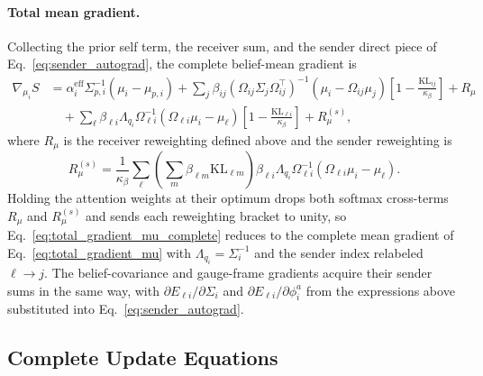 \documentclass[11pt]{article}
\begin{document}
\paragraph{Total mean gradient.}
Collecting the prior self term, the receiver sum, and the sender direct piece of Eq.~\eqref{eq:sender_autograd}, the complete belief-mean gradient is
\begin{equation}
\boxed{
\begin{aligned}
\nabla_{\mu_i} S &= \alpha_i^{\mathrm{eff}}\Sigma_{p,i}^{-1}(\mu_i - \mu_{p,i}) + \sum_j \beta_{ij}(\Omega_{ij}\Sigma_j\Omega_{ij}^{\top})^{-1}(\mu_i - \Omega_{ij}\mu_j)\left[1 - \frac{\mathrm{KL}_{ij}}{\kappa_\beta}\right] + R_\mu \\
&\quad + \sum_\ell \beta_{\ell i}\Lambda_{q_i}\Omega_{\ell i}^{-1}\left(\Omega_{\ell i}\mu_i - \mu_\ell\right)\left[1 - \frac{\mathrm{KL}_{\ell i}}{\kappa_\beta}\right] + R_\mu^{(s)},
\end{aligned}}
\label{eq:total_gradient_mu_complete}
\end{equation}
where $R_\mu$ is the receiver reweighting defined above and the sender reweighting is
\begin{equation}
R_\mu^{(s)} = \frac{1}{\kappa_\beta}\sum_\ell \left(\sum_m \beta_{\ell m}\mathrm{KL}_{\ell m}\right)\beta_{\ell i}\Lambda_{q_i}\Omega_{\ell i}^{-1}\left(\Omega_{\ell i}\mu_i - \mu_\ell\right).
\end{equation}
Holding the attention weights at their optimum drops both softmax cross-terms $R_\mu$ and $R_\mu^{(s)}$ and sends each reweighting bracket to unity, so Eq.~\eqref{eq:total_gradient_mu_complete} reduces to the complete mean gradient of Eq.~\eqref{eq:total_gradient_mu} with $\Lambda_{q_i} = \Sigma_i^{-1}$ and the sender index relabeled $\ell \to j$. The belief-covariance and gauge-frame gradients acquire their sender sums in the same way, with $\partial E_{\ell i}/\partial \Sigma_i$ and $\partial E_{\ell i}/\partial \phi_i^a$ from the expressions above substituted into Eq.~\eqref{eq:sender_autograd}.

\subsection*{Complete Update Equations}
\end{document}
